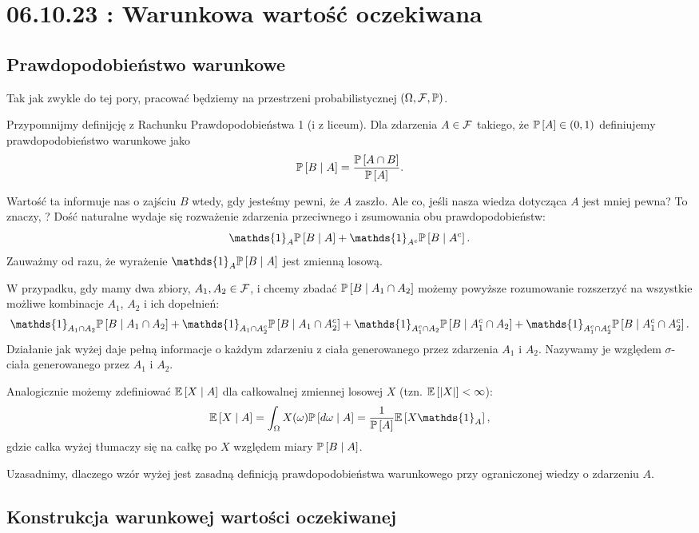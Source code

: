 \section{06.10.23 : Warunkowa wartość oczekiwana}

\subsection{Prawdopodobieństwo warunkowe}

Tak jak zwykle do tej pory, pracować będziemy na przestrzeni probabilistycznej $(\Omega,\set{F},\prob)$.

Przypomnijmy definijcję  z Rachunku Prawdopodobieństwa 1 (i z liceum). Dla zdarzenia $A\in\mathcal{F}$ takiego, że $\prob{A}\in(0, 1)$ definiujemy prawdopodobieństwo warunkowe jako
$$\prob{B\;|\;A}=\frac{\prob{A\cap B}}{\prob{A}}.$$

Wartość ta informuje nas o zajściu $B$ wtedy, gdy jesteśmy pewni, że $A$ zaszło. Ale co, jeśli nasza wiedza dotycząca $A$ jest mniej pewna? To znaczy, ? Dość naturalne wydaje się rozważenie zdarzenia przeciwnego i zsumowania obu prawdopodobieństw:
$$\mathds{1}_A\prob{B\;|\;A}+\mathds{1}_{A^c}\prob{B\;|\;A^c}.$$
Zauważmy od razu, że wyrażenie $\mathds{1}_A\prob{B\;|\;A}$ jest zmienną losową.

W przypadku, gdy mamy dwa zbiory, $A_1,A_2\in\mathcal{F}$, i chcemy zbadać $\prob{B\;|\;A_1\cap A_2}$ możemy powyższe rozumowanie rozszerzyć na wszystkie możliwe kombinacje $A_1$, $A_2$ i ich dopełnień:
$$\mathds{1}_{A_1\cap A_2}\prob{B\;|\;A_1\cap A_2}+\mathds{1}_{A_1\cap A_2^c}\prob{B\;|\;A_1\cap A_2^c}+\mathds{1}_{A_1^c\cap A_2}\prob{B\;|\;A_1^c\cap A_2}+\mathds{1}_{A_1^c\cap A_2^c}\prob{B\;|\;A_1^c\cap A_2^c}.$$
Działanie jak wyżej daje pełną informacje o każdym zdarzeniu z ciała generowanego przez zdarzenia $A_1$ i $A_2$. Nazywamy je  względem $\sigma$-ciała generowanego przez $A_1$ i $A_2$.

Analogicznie możemy zdefiniować $\expected{X\;|\;A}$ dla całkowalnej zmiennej losowej $X$ (tzn. $\expected{|X|}<\infty$):
$$\expected{X\;|\;A}=\int_\Omega X(\omega)\prob{d\omega\;|\;A}=\frac{1}{\prob{A}}\expected{X\mathds{1}_A},$$
gdzie całka wyżej tłumaczy się na całkę po $X$ względem miary $\prob{B\;|\;A}$. 

Uzasadnimy, dlaczego wzór wyżej jest zasadną definicją prawdopodobieństwa warunkowego przy ograniczonej wiedzy o zdarzeniu $A$.

\subsection{Konstrukcja warunkowej wartości oczekiwanej}

